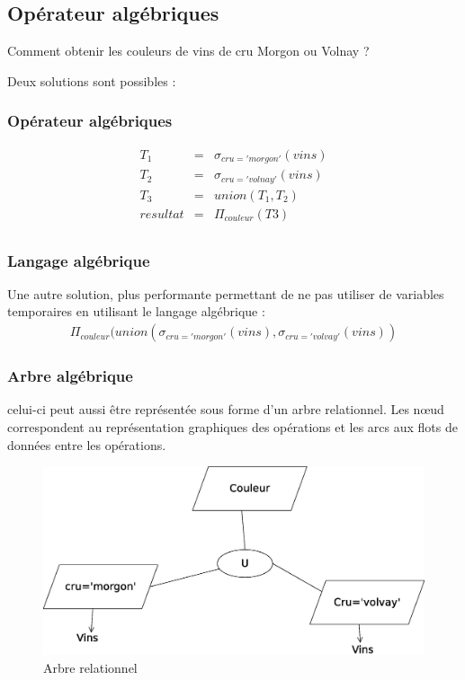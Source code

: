 \documentclass[12pt,a4paper,openany]{book}
\begin{document}
	\subsection{Opérateur algébriques}
	Comment obtenir les couleurs de vins de cru Morgon ou Volnay ? 	

	Deux solutions sont possibles : 
	\subsubsection{Opérateur algébriques}
	\begin{eqnarray*}
		T_1 &=& \sigma_{cru='morgon'}(vins)\\
		T_2 &=&  \sigma_{cru='volnay'}(vins)\\
		T_3 &=& union(T_1, T_2)\\
		resultat &=& \Pi_{couleur}(T3)\\
	\end{eqnarray*}

	\subsubsection{Langage algébrique}
	Une autre solution, plus performante permettant de ne pas utiliser de variables temporaires en utilisant le langage algébrique : 
	\begin{eqnarray*}
		\Pi_{couleur}(union(\sigma_{cru='morgon'}(vins), \sigma_{cru='volvay'}(vins))
	\end{eqnarray*}

	\subsubsection{Arbre algébrique}
	celui-ci peut aussi être représentée sous forme d'un arbre relationnel. Les n\oe{}ud correspondent au représentation graphiques des opérations et
	les arcs aux flots de données entre les opérations.
	\begin{figure}[H]
		\centering
		\includegraphics[width=15cm]{arbreRelationnel.eps}
		\caption{Arbre relationnel}
	\end{figure}
\end{document}
